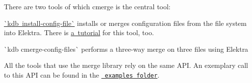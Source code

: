 There are two tools of which cmerge is the central tool\+:


\begin{DoxyEnumerate}
\item \mbox{\hyperlink{doc_help_kdb-install-config-file_md}{\`{}kdb install-\/config-\/file\`{}}} installs or merges configuration files from the file system into Elektra. There is \mbox{\hyperlink{doc_tutorials_install-config-files_md}{a tutorial}} for this tool, too.
\item \`{}kdb cmerge-\/config-\/files\`{} performs a three-\/way merge on three files using Elektra
\end{DoxyEnumerate}

All the tools that use the merge library rely on the same A\+PI. An exemplary call to this A\+PI can be found in the \href{/home/mpranj/workspace/libelektra/examples/kdbset.c}{\texttt{ examples folder}}. 